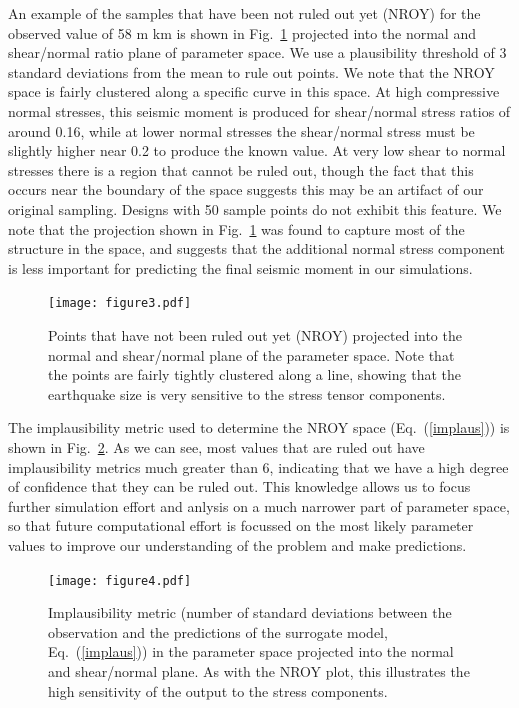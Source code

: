 \documentclass[openacc]{rstransa}%
\begin{document}
An example of the samples that have been not ruled out yet (NROY) for the observed value of 58 m km
is shown in Fig.~\ref{fig_nroy} projected into the normal and shear/normal ratio plane of parameter
space. We use a plausibility threshold of 3 standard deviations from the mean to rule out points.
We note that the NROY space is fairly clustered along a specific curve in this space.
At high compressive normal stresses, this seismic moment is produced for shear/normal stress ratios
of around 0.16, while at lower normal stresses the shear/normal stress must be slightly higher
near 0.2 to
produce the known value. At very low shear to normal stresses there is a region that cannot be
ruled out, though the fact that this occurs near the boundary of the space suggests this may be
an artifact of our original sampling. Designs with 50 sample points do not exhibit this feature.
We note that the projection shown in Fig.~\ref{fig_nroy} was found to capture most of the structure
in the space, and suggests that the additional normal
stress component is less important for predicting the final seismic moment in our simulations.

\begin{figure}[!h]
\centering\texttt{[image: figure3.pdf]}
\caption{Points that have not been ruled out yet (NROY) projected into the normal and shear/normal plane of the parameter space. Note that the points are fairly tightly clustered along a line, showing that the earthquake size is very sensitive to the stress tensor components.}
\label{fig_nroy}
\end{figure}

The implausibility metric used to determine the NROY space (Eq.~(\ref{implaus})) is shown in
Fig.~\ref{fig_implausibility}. As we can see, most values that are ruled out have implausibility
metrics much greater than 6, indicating that we have a high degree of confidence that they can be
ruled out. This knowledge allows us to focus further simulation effort and anlysis on a much narrower
part of parameter space, so that future computational effort is focussed on the most likely parameter
values to improve our understanding of the problem and make predictions.

\begin{figure}[!h]
\centering\texttt{[image: figure4.pdf]}
\caption{Implausibility metric (number of standard deviations between the observation and the predictions of the surrogate model, Eq.~(\ref{implaus})) in the parameter space projected into the normal and shear/normal plane. As with the NROY plot, this illustrates the high sensitivity of the output to the stress components.}
\label{fig_implausibility}
\end{figure}
\end{document}
